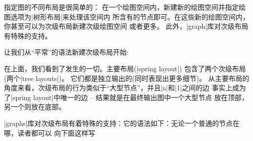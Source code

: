 指定图的不同布局是很简单的：
在一个绘图空间内，新建新的绘图空间并指定绘图选项为|树形布局|来处理该空间内
所含有的节点即可。在这些新的绘图空间内，你甚至可以为次级布局新建次级绘图空间
或者更多。
此外，|graph|库对次级布局有特殊的支持。

让我们从``平常''的语法新建次级布局开始:


\begin{codeexample}[]
\end{codeexample}

在上面，我们看到了发生的一切。主要布局(|spring layout|)
包含了两个次级布局(两个|tree layouts|)。
它们都是独立输出的(同时表现出更多细节)。
从主要布局的角度来看，次级布局的行为类似于``大型节点''，并且|a|和|1|之间的边
事实上成为了|spring layout|中唯一的边 -- 结果就是在最终输出图中一个大型节点
放在顶部，另一个则放在底部。

|graphs|库对次级布局有着特殊的支持：它的语法如下：无论一个普通的节点在哪，读者都可以
向下面这样写


